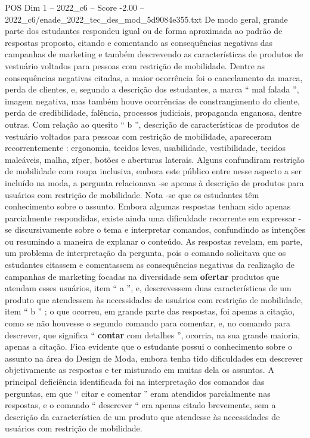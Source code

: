 \begin{textsample}{POS Dim 1 – 2022\_c6 – Score -2.00 – 2022\_c6/enade\_2022\_tec\_des\_mod\_5d9084e355.txt}
De modo geral, grande parte dos estudantes respondeu igual ou de forma aproximada ao padrão de respostas proposto, citando e comentando as consequências negativas das campanhas de marketing e também descrevendo as características de produtos de vestuário voltados para pessoas com restrição de mobilidade.
Dentre as consequências negativas citadas, a maior ocorrência foi o cancelamento da marca, perda de clientes, e, segundo a descrição dos estudantes, a marca “ mal falada ”, imagem negativa, mas também houve ocorrências de constrangimento do cliente, perda de credibilidade, falência, processos judiciais, propaganda enganosa, dentre outras.
Com relação ao quesito “ b ”, descrição de características de produtos de vestuário voltados para pessoas com restrição de mobilidade, apareceram recorrentemente : ergonomia, tecidos leves, usabilidade, vestibilidade, tecidos maleáveis, malha, zíper, botões e aberturas laterais.
Alguns confundiram restrição de mobilidade com roupa inclusiva, embora este público entre nesse aspecto a ser incluído na moda, a pergunta relacionava -se apenas à descrição de produtos para usuários com restrição de mobilidade.
Nota -se que os estudantes têm conhecimento sobre o assunto.
Embora algumas respostas tenham sido apenas parcialmente respondidas, existe ainda uma dificuldade recorrente em expressar -se discursivamente sobre o tema e interpretar comandos, confundindo as intenções ou resumindo a maneira de explanar o conteúdo.
As respostas revelam, em parte, um problema de interpretação da pergunta, pois o comando solicitava que os estudantes citassem e comentassem as consequências negativas da realização de campanhas de marketing focadas na diversidade sem \textbf{ofertar} produtos que atendam esses usuários, item “ a ”, e, descrevessem duas características de um produto que atendessem às necessidades de usuários com restrição de mobilidade, item “ b ” ; o que ocorreu, em grande parte das respostas, foi apenas a citação, como se não houvesse o segundo comando para comentar, e, no comando para descrever, que significa “ \textbf{contar} com detalhes ”, ocorria, na sua grande maioria, apenas a citação.
Fica evidente que o estudante possui o conhecimento sobre o assunto na área do Design de Moda, embora tenha tido dificuldades em descrever objetivamente as respostas e ter misturado em muitas dela os assuntos.
A principal deficiência identificada foi na interpretação dos comandos das perguntas, em que “ citar e comentar ” eram atendidos parcialmente nas respostas, e o comando “ descrever “ era apenas citado brevemente, sem a descrição da característica de um produto que atendesse às necessidades de usuários com restrição de mobilidade.

\end{textsample}

